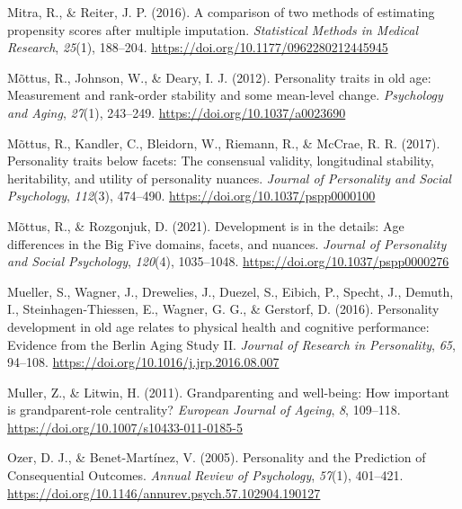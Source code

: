 \documentclass[
  english,
  man, noextraspace]{apa7}
\begin{document}
\leavevmode\hypertarget{ref-mitraComparisonTwoMethods2016}{}%
Mitra, R., \& Reiter, J. P. (2016). A comparison of two methods of estimating propensity scores after multiple imputation. \emph{Statistical Methods in Medical Research}, \emph{25}(1), 188--204. \url{https://doi.org/10.1177/0962280212445945}

\leavevmode\hypertarget{ref-mottusPersonalityTraitsOld2012}{}%
Mõttus, R., Johnson, W., \& Deary, I. J. (2012). Personality traits in old age: Measurement and rank-order stability and some mean-level change. \emph{Psychology and Aging}, \emph{27}(1), 243--249. \url{https://doi.org/10.1037/a0023690}

\leavevmode\hypertarget{ref-mottusPersonalityTraitsFacets2017}{}%
Mõttus, R., Kandler, C., Bleidorn, W., Riemann, R., \& McCrae, R. R. (2017). Personality traits below facets: The consensual validity, longitudinal stability, heritability, and utility of personality nuances. \emph{Journal of Personality and Social Psychology}, \emph{112}(3), 474--490. \url{https://doi.org/10.1037/pspp0000100}

\leavevmode\hypertarget{ref-mottusDevelopmentDetailsAge2021}{}%
Mõttus, R., \& Rozgonjuk, D. (2021). Development is in the details: Age differences in the Big Five domains, facets, and nuances. \emph{Journal of Personality and Social Psychology}, \emph{120}(4), 1035--1048. \url{https://doi.org/10.1037/pspp0000276}

\leavevmode\hypertarget{ref-muellerPersonalityDevelopmentOld2016}{}%
Mueller, S., Wagner, J., Drewelies, J., Duezel, S., Eibich, P., Specht, J., Demuth, I., Steinhagen-Thiessen, E., Wagner, G. G., \& Gerstorf, D. (2016). Personality development in old age relates to physical health and cognitive performance: Evidence from the Berlin Aging Study II. \emph{Journal of Research in Personality}, \emph{65}, 94--108. \url{https://doi.org/10.1016/j.jrp.2016.08.007}

\leavevmode\hypertarget{ref-mullerGrandparentingWellbeingHow2011}{}%
Muller, Z., \& Litwin, H. (2011). Grandparenting and well-being: How important is grandparent-role centrality? \emph{European Journal of Ageing}, \emph{8}, 109--118. \url{https://doi.org/10.1007/s10433-011-0185-5}

\leavevmode\hypertarget{ref-ozerPersonalityPredictionConsequential2005}{}%
Ozer, D. J., \& Benet-Martínez, V. (2005). Personality and the Prediction of Consequential Outcomes. \emph{Annual Review of Psychology}, \emph{57}(1), 401--421. \url{https://doi.org/10.1146/annurev.psych.57.102904.190127}
\end{document}
